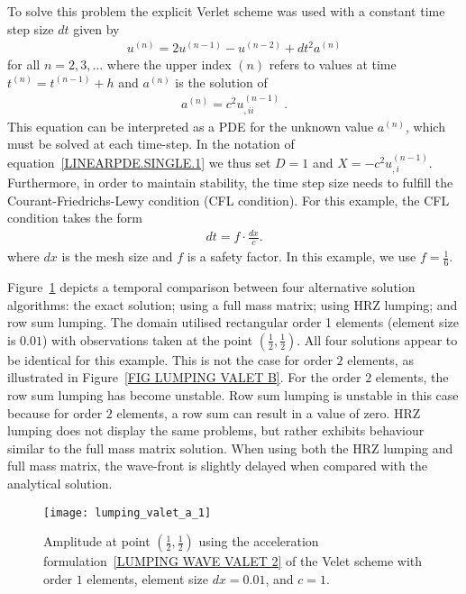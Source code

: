 To solve this problem the explicit Verlet scheme was used 
with a constant time step size $dt$ given by 
\begin{eqnarray} \label{LUMPING WAVE VALET}
u^{(n)}=2u^{(n-1)}-u^{(n-2)} + dt^2 a^{(n)}
\end{eqnarray}
for all $n=2,3,\ldots$ where the upper index ${(n)}$ refers to values at 
time $t^{(n)}=t^{(n-1)}+h$ and $a^{(n)}$ is the solution of 
\begin{eqnarray} \label{LUMPING WAVE VALET 2} 
a^{(n)}=c^2 u^{(n-1)}_{,ii} \; .
\end{eqnarray}
This equation can be interpreted as a PDE for the unknown value $a^{(n)}$,
which must be solved at each time-step. 
In the notation of equation~\ref{LINEARPDE.SINGLE.1} we thus set $D=1$ and 
$X=-c^2 u^{(n-1)}_{,i}$. Furthermore, in order to maintain stability, 
the time step size needs to fulfill the Courant-Friedrichs-Lewy condition 
(CFL condition).
For this example, the CFL condition takes the form 
\begin{eqnarray} \label{LUMPING WAVE CFL} 
dt = f \cdot \frac{dx}{c} .
\end{eqnarray}
where $dx$ is the mesh size and $f$ is a safety factor. In this example, 
we use $f=\frac{1}{6}$.

Figure~\ref{FIG LUMPING VALET A} depicts a temporal comparison between four 
alternative solution algorithms: the exact solution; using a full mass matrix;
using HRZ lumping; and row sum lumping. The domain utilised rectangular order 1 
elements (element size is $0.01$) with observations taken at the point 
$(\frac{1}{2},\frac{1}{2})$. 
All four solutions appear to be identical for this example. This is not the case
for order $2$ elements, as illustrated in Figure~\ref{FIG LUMPING VALET B}.
For the order $2$ elements, the row sum lumping has become unstable. Row sum
lumping is unstable in this case because for order $2$ elements, a row sum can 
result in a value of zero. HRZ lumping does not display the same problems, but 
rather exhibits behaviour similar to the full mass matrix solution. When using
both the HRZ lumping and full mass matrix, the wave-front is slightly delayed 
when compared with the analytical solution.

\begin{figure}[ht]
\centerline{\texttt{[image: lumping\_valet\_a\_1]}}
\caption{Amplitude at point $(\frac{1}{2},\frac{1}{2})$ using the acceleration formulation~\ref{LUMPING WAVE VALET 2} of the 
Velet scheme with order $1$ elements, element size $dx=0.01$, and $c=1$.}
\label{FIG LUMPING VALET A}
\end{figure}

